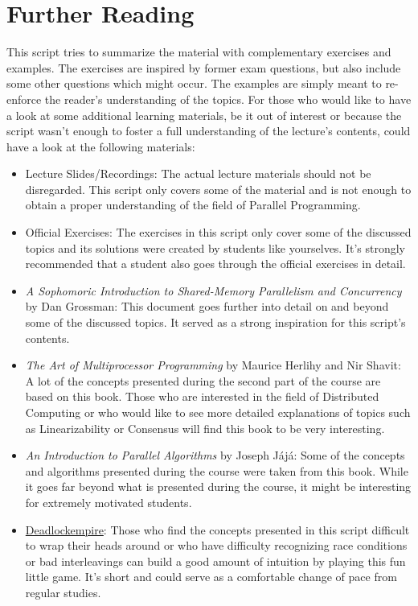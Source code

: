 \documentclass[main]{subfiles}
\begin{document}
\section{Further Reading}
This script tries to summarize the material with complementary exercises and examples. The exercises are inspired by former exam questions, but also include some other questions which might occur. The examples are simply meant to re-enforce the reader's understanding of the topics. For those who would like to have a look at some additional learning materials, be it out of interest or because the script wasn't enough to foster a full understanding of the lecture's contents, could have a look at the following materials:
\begin{itemize}
    \item Lecture Slides/Recordings: The actual lecture materials should not be disregarded. This script only covers some of the material and is not enough to obtain a proper understanding of the field of Parallel Programming.
    \item Official Exercises: The exercises in this script only cover some of the discussed topics and its solutions were created by students like yourselves. It's strongly recommended that a student also goes through the official exercises in detail.
    \item  \textit{A Sophomoric Introduction to Shared-Memory Parallelism and Concurrency} by Dan Grossman: This document goes further into detail on and beyond some of the discussed topics. It served as a strong inspiration for this script's contents.
    \item \textit{The Art of Multiprocessor Programming} by Maurice Herlihy and Nir Shavit: A lot of the concepts presented during the second part of the course are based on this book. Those who are interested in the field of Distributed Computing or who would like to see more detailed explanations of topics such as Linearizability or Consensus will find this book to be very interesting.
    \item \textit{An Introduction to Parallel Algorithms} by Joseph Jájá: Some of the concepts and algorithms presented during the course were taken from this book. While it goes far beyond what is presented during the course, it might be interesting for extremely motivated students.
    \item \href{https://deadlockempire.github.io/}{Deadlockempire}: Those who find the concepts presented in this script difficult to wrap their heads around or who have difficulty recognizing race conditions or bad interleavings can build a good amount of intuition by playing this fun little game. It's short and could serve as a comfortable change of pace from regular studies.
\end{itemize}
\end{document}
